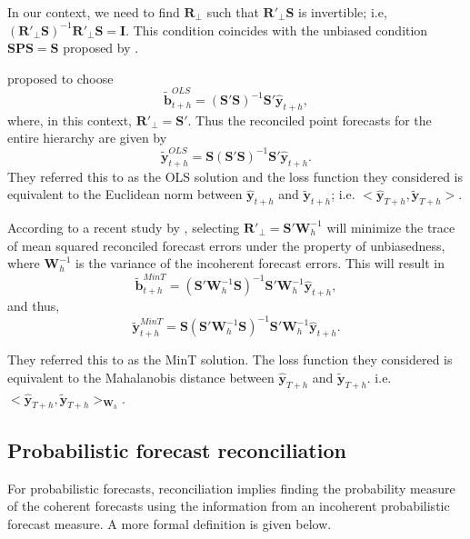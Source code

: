 \documentclass[a4paper, 11pt]{article}
\begin{document}
In our context, we need to find $\bm{R}_\bot$ such that $\bm{R}'_\bot \bm{S}$ is invertible; i.e, $(\bm{R}'_\bot \bm{S})^{-1}\bm{R}'_\bot \bm{S}=\bm{I}$. This condition coincides with the unbiased condition $\bm{SPS}=\bm{S}$ proposed by \citet{Hyndman2011}.

\citet{Hyndman2011} proposed to choose
\begin{equation}
\tilde{\bm{b}}^{OLS}_{t+h}=(\bm{S}' \bm{S})^{-1}\bm{S}' \hat{\bm{y}}_{t+h},
\end{equation}
where, in this context, $\bm{R}'_\bot = \bm{S}'$. Thus the reconciled point forecasts for the entire hierarchy are given by
\begin{equation}
\tilde{\bm{y}}^{OLS}_{t+h}=\bm{S}(\bm{S}' \bm{S})^{-1}\bm{S}' \hat{\bm{y}}_{t+h}.
\end{equation}
They referred this to as the OLS solution and the loss function they considered is equivalent to the Euclidean norm between $\hat{\bm{y}}_{t+h}$ and $\tilde{\bm{y}}_{t+h}$; i.e. $<\hat{\bm{y}}_{T+h}, \tilde{\bm{y}}_{T+h}>$.

According to a recent study by \citet{Wickramasuriya2017}, selecting $\bm{R}'_\bot = \bm{S}'\bm{W}^{-1}_{h}$ will minimize the trace of mean squared reconciled forecast errors under the property of unbiasedness, where $\bm{W}^{-1}_{h}$ is the variance of the incoherent forecast errors. This will result in
\begin{equation}
\tilde{\bm{b}}^{MinT}_{t+h}=(\bm{S}'\bm{W}^{-1}_{h} \bm{S})^{-1}\bm{S}'\bm{W}^{-1}_{h} \hat{\bm{y}}_{t+h},
\end{equation}
and thus,
\begin{equation}
\tilde{\bm{y}}^{MinT}_{t+h}=\bm{S}(\bm{S}' \bm{W}^{-1}_{h}\bm{S})^{-1}\bm{S}'\bm{W}^{-1}_{h} \hat{\bm{y}}_{t+h}.
\end{equation}

They referred this to as the MinT solution. The loss function they considered is equivalent to the Mahalanobis distance between $\hat{\bm{y}}_{T+h}$ and $\tilde{\bm{y}}_{T+h}$. i.e. $<\hat{\bm{y}}_{T+h}, \tilde{\bm{y}}_{T+h}>_{\bm{W}_h}$.

\subsection{Probabilistic forecast reconciliation}

For probabilistic forecasts, reconciliation implies finding the probability measure of the coherent forecasts using the information from an incoherent probabilistic forecast measure. A more formal definition is given below.
\end{document}
